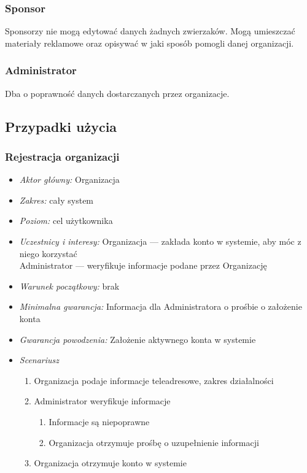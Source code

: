 \documentclass[10pt,a4paper]{article}
\begin{document}
\subsubsection{Sponsor}
Sponsorzy nie mogą edytować danych żadnych zwierzaków. Mogą umieszczać materiały reklamowe oraz opisywać w jaki sposób pomogli danej organizacji.
\subsubsection{Administrator}
Dba o poprawność danych dostarczanych przez organizacje.
\subsection{Przypadki użycia}
\subsubsection{Rejestracja organizacji}
\begin{itemize}
	\item \emph{Aktor główny:} Organizacja
	\item \emph{Zakres:} cały system
	\item \emph{Poziom:} cel użytkownika
	\item \emph{Uczestnicy i interesy:} 
		Organizacja --- zakłada konto w systemie, aby móc z niego korzystać\\
		Administrator --- weryfikuje informacje podane przez Organizację
	\item \emph{Warunek początkowy:} brak
	\item \emph{Minimalna gwarancja:} Informacja dla Administratora o prośbie o założenie konta
	\item \emph{Gwarancja powodzenia:} Założenie aktywnego konta w systemie
	\item \emph{Scenariusz}
	\begin{enumerate}
		\item Organizacja podaje informacje teleadresowe, zakres działalności
		\item Administrator weryfikuje informacje
		\begin{enumerate}
			\item Informacje są niepoprawne
			\item Organizacja otrzymuje prośbę o uzupełnienie informacji
		\end{enumerate}
		\item Organizacja otrzymuje konto w systemie
	\end{enumerate}
\end{itemize}
\end{document}

